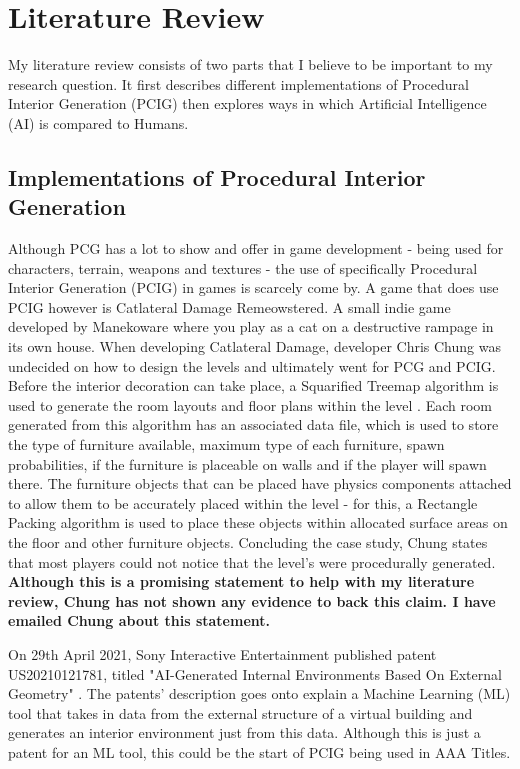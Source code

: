 \section{Literature Review}
My literature review consists of two parts that I believe to be important to my research question.
It first describes different implementations of Procedural Interior Generation (PCIG) then explores
ways in which Artificial Intelligence (AI) is compared to Humans.

\subsection{Implementations of Procedural Interior Generation}
Although PCG has a lot to show and offer in game development - being used for
characters, terrain, weapons and textures - the use of specifically Procedural Interior Generation 
(PCIG) in games is scarcely come by.
A game that does use PCIG however is Catlateral Damage Remeowstered\cite{game:catlateral}.
A small indie game developed by Manekoware where you play as a cat on a destructive rampage 
in its own house.
When developing Catlateral Damage, developer Chris Chung was 
undecided on how to design the levels and ultimately went for PCG and PCIG\cite{pcg_in_gd}.
Before the interior decoration can take place, a Squarified Treemap algorithm 
is used to generate the room layouts and floor plans within the level \cite{squarified-treemap}.
Each room generated from this algorithm has an associated data file, which is used to store the type of furniture available, maximum type of each furniture, spawn probabilities, if the furniture is placeable on walls and if the player will spawn there.
The furniture objects that can be placed have physics components attached to allow them to be accurately placed within the level -
for this, a Rectangle Packing algorithm is used to place these objects within allocated surface areas on the floor and other furniture objects.
Concluding the case study, Chung states that most players could not notice that the level's were procedurally generated.
\textbf{Although this is a promising statement to help with my literature review, Chung has not shown any evidence to back this claim. I have emailed Chung about this statement.}

\bigskip
On 29th April 2021, Sony Interactive Entertainment published patent US20210121781, 
titled "AI-Generated Internal Environments Based On External Geometry" \cite{sony-patent}.
The patents' description goes onto explain a 
Machine Learning (ML) tool that takes in data from the external structure of a virtual building
and generates an interior environment just from this data.
Although this is just a patent for an ML tool, this could be the start of PCIG being used in AAA Titles. 

